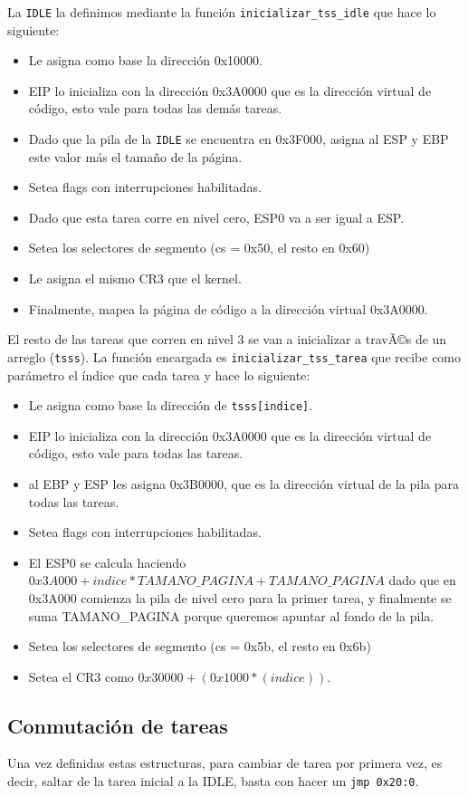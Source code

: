 \documentclass[10pt, a4paper]{article}
\begin{document}
La \texttt{IDLE} la definimos mediante la función \texttt{inicializar\_tss\_idle} que hace lo siguiente:
\begin{itemize}
\item Le asigna como base la dirección 0x10000.
\item EIP lo inicializa con la dirección 0x3A0000 que es la dirección virtual de código, esto vale para todas las demás tareas.
\item Dado que la pila de la \texttt{IDLE} se encuentra en 0x3F000, asigna al ESP y EBP este valor más el tamaño de la página.
\item Setea flags con interrupciones habilitadas.
\item Dado que esta tarea corre en nivel cero, ESP0 va a ser igual a ESP.
\item Setea los selectores de segmento (cs = 0x50, el resto en 0x60)
\item Le asigna el mismo CR3 que el kernel.
\item Finalmente, mapea la página de código a la dirección virtual 0x3A0000.
\end{itemize} 
El resto de las tareas que corren en nivel 3 se van a inicializar a travÃ©s de un arreglo (\texttt{tsss}).
La función encargada es \texttt{inicializar\_tss\_tarea} que recibe como parámetro el índice que cada tarea 
y hace lo siguiente:
\begin{itemize}
\item Le asigna como base la dirección de \texttt{tsss[indice]}.
\item EIP lo inicializa con la dirección 0x3A0000 que es la dirección virtual de código, esto vale para todas las tareas.
\item al EBP y ESP les asigna 0x3B0000, que es la dirección virtual de la pila para todas las tareas.
\item Setea flags con interrupciones habilitadas.
\item El ESP0 se calcula haciendo \texttt{$0x3A000 + indice*TAMANO\_PAGINA +TAMANO\_PAGINA$} dado que en 0x3A000 comienza la pila de nivel cero para la primer
tarea, y finalmente se suma TAMANO\_PAGINA porque queremos apuntar al fondo de la pila.
\item Setea los selectores de segmento (cs = 0x5b, el resto en 0x6b)
\item Setea el CR3 como \texttt{$0x30000+(0x1000*(indice))$}.
\end{itemize}

\subsection{Conmutación de tareas}
Una vez definidas estas estructuras, para cambiar de tarea por primera vez, es decir, saltar de la tarea inicial a la IDLE, basta con hacer un \texttt{jmp 0x20:0}.
\newpage
\end{document}
